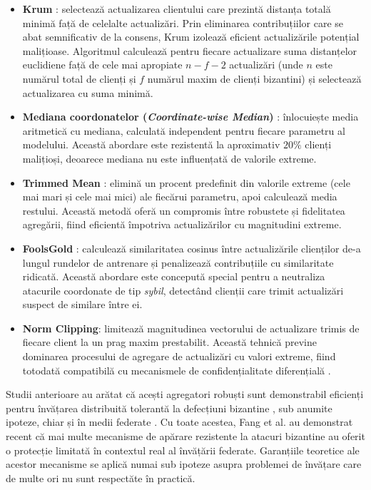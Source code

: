 \documentclass[../../main.tex]{subfiles}
\begin{document}
    \begin{itemize}
        \item \textbf{Krum} \cite{blanchard2017byzantine}: selectează actualizarea clientului care prezintă distanța totală minimă față de celelalte actualizări. Prin eliminarea contribuțiilor care se abat semnificativ de la consens, Krum izolează eficient actualizările potențial malițioase. Algoritmul calculează pentru fiecare actualizare suma distanțelor euclidiene față de cele mai apropiate $n - f - 2$ actualizări (unde $n$ este numărul total de clienți și $f$ numărul maxim de clienți bizantini) și selectează actualizarea cu suma minimă.

        \item \textbf{Mediana coordonatelor (\textit{Coordinate-wise Median})} \cite{yin2019byzantine}: înlocuiește media aritmetică cu mediana, calculată independent pentru fiecare parametru al modelului. Această abordare este rezistentă la aproximativ $20\%$ clienți malițioși, deoarece mediana nu este influențată de valorile extreme.

        \item \textbf{Trimmed Mean} \cite{yin2019byzantine}: elimină un procent predefinit din valorile extreme (cele mai mari și cele mai mici) ale fiecărui parametru, apoi calculează media restului. Această metodă oferă un compromis între robustete și fidelitatea agregării, fiind eficientă împotriva actualizărilor cu magnitudini extreme.

        \item \textbf{FoolsGold} \cite{fung2020mitigating}: calculează similaritatea cosinus între actualizările clienți\-lor de-a lungul rundelor de antrenare și penalizează contribuțiile cu similaritate ridicată. Această abordare este concepută special pentru a neutraliza atacurile coordonate de tip \textit{sybil}, detectând clienții care trimit actualizări suspect de similare între ei.

        \item \textbf{Norm Clipping}: limitează magnitudinea vectorului de actualizare trimis de fiecare client la un prag maxim prestabilit. Această tehnică previne dominarea procesului de agregare de actualizări cu valori extreme, fiind totodată compatibilă cu mecanismele de confidențialitate diferențială \cite{kairouz2021federated}.
    \end{itemize}

    Studii anterioare au arătat că acești agregatori robuști sunt demonstrabil eficienți pentru învățarea distribuită tolerantă la defecțiuni bizantine \cite{blanchard2017byzantine, yin2019byzantine}, sub anumite ipoteze, chiar și în medii federate \cite{kairouz2021federated}. Cu toate acestea, Fang et al. \cite{fang2019local} au demonstrat recent că mai multe mecanisme de apărare rezistente la atacuri bizantine au oferit o protecție limitată în contextul real al învățării federate. Garanțiile teoretice ale acestor mecanisme se aplică numai sub ipoteze asupra problemei de învățare care de multe ori nu sunt respectăte în practică.
\end{document}
